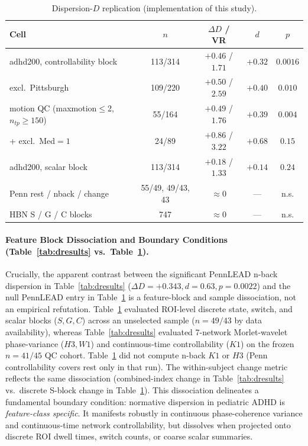 \documentclass{article}
\begin{document}
\begin{table}[H]
\centering
\caption{Dispersion-$D$ replication (implementation of this study).}
\begin{tabular}{lcccc}
\toprule
Cell & $n$ & $\Delta D$ / VR & $d$ & $p$ \\
\midrule
adhd200, controllability block & 113/314 & $+0.46$ / $1.71$ & $+0.32$ & $0.0016$ \\
\quad excl.\ Pittsburgh & 109/220 & $+0.50$ / $2.59$ & $+0.40$ & $0.010$ \\
\quad motion QC (maxmotion$\le$2, $n_{tp}{\ge}150$) & 55/164 & $+0.49$ / $1.76$ & $+0.39$ & $0.004$ \\
\quad + excl.\ Med${=}1$ & 24/89 & $+0.86$ / $3.22$ & $+0.68$ & $0.15$ \\
adhd200, scalar block & 113/314 & $+0.18$ / $1.33$ & $+0.14$ & $0.24$ \\
Penn rest / nback / change & 55/49, 49/43, 43 & $\approx0$ & --- & n.s. \\
HBN S / G / C blocks & 747 & $\approx0$ & --- & n.s. \\
\bottomrule
\end{tabular}
\label{tab:dispersion}
\end{table}

\paragraph{Feature Block Dissociation and Boundary Conditions (Table~\ref{tab:dresults} vs.\ Table~\ref{tab:dispersion}).}
Crucially, the apparent contrast between the significant PennLEAD n-back dispersion in Table~\ref{tab:dresults} ($\Delta D = +0.343, d=0.63, p=0.0022$) and the null PennLEAD entry in Table~\ref{tab:dispersion} is a feature-block and sample dissociation, not an empirical refutation. Table~\ref{tab:dispersion} evaluated ROI-level discrete state, switch, and scalar blocks ($S, G, C$) across an unselected sample ($n{=}49/43$ by data availability), whereas Table~\ref{tab:dresults} evaluated 7-network Morlet-wavelet phase-variance ($H3, W1$) and continuous-time controllability ($K1$) on the frozen $n{=}41/45$ QC cohort. Table~\ref{tab:dispersion} did not compute n-back $K1$ or $H3$ (Penn controllability covers rest only in that run). The within-subject change metric reflects the same dissociation (combined-index change in Table~\ref{tab:dresults} vs.\ discrete S-block change in Table~\ref{tab:dispersion}). This dissociation delineates a fundamental boundary condition: normative dispersion in pediatric ADHD is \emph{feature-class specific}. It manifests robustly in continuous phase-coherence variance and continuous-time network controllability, but dissolves when projected onto discrete ROI dwell times, switch counts, or coarse scalar summaries.
\end{document}
